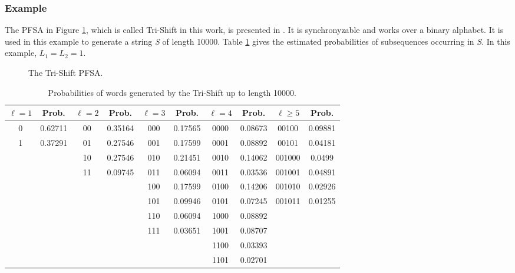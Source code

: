 {\subsubsection{Example}

The PFSA in Figure \ref{fig:trishift}, which is called Tri-Shift in this work, is presented in \citep{asok.11}. It is synchronyzable and works over a binary alphabet. It is used in this example to generate a string \textit{S} of length 10000. Table \ref{tab:trishiftsub} gives the estimated probabilities of subsequences occurring in \textit{S}. In this example, $L_1 = L_2 = 1$.

\begin{figure}
\centering
{}
\caption{The Tri-Shift PFSA.\label{fig:trishift}}
\end{figure}

\begin{table}
\centering
\caption{Probabilities of words generated by the Tri-Shift up to length 10000. \label{tab:trishiftsub}}
\begin{tabular}{|c|c|c|c|c|c|c|c|c|c|}
\hline
$\ell = 1$ & Prob. & $\ell = 2$ & Prob. & $\ell = 3$ & Prob. & $\ell = 4$ & Prob. & $\ell \geq 5$ & Prob.\\
\hline
0 & 0.62711 & 00 & 0.35164 & 000 & 0.17565 & 0000 & 0.08673 & 00100 & 0.09881\\
1 & 0.37291 & 01 & 0.27546 & 001 & 0.17599 & 0001 & 0.08892 & 00101 & 0.04181\\
  &      & 10 & 0.27546 & 010 & 0.21451 & 0010 & 0.14062 & 001000 & 0.0499\\
  &      & 11 & 0.09745 & 011 & 0.06094 & 0011 & 0.03536 & 001001 & 0.04891\\
  &	     &    &      & 100 & 0.17599 & 0100 & 0.14206 & 001010 & 0.02926\\
  &      &    &      & 101 & 0.09946 & 0101 & 0.07245 & 001011 & 0.01255\\
  &      &    &      & 110 & 0.06094 & 1000 & 0.08892 &        &     \\
  &      &    &      & 111 & 0.03651 & 1001 & 0.08707 &        &     \\
  &      &    &      &     &      & 1100 & 0.03393 &        &     \\
  &      &    &      &     &      & 1101 & 0.02701 &        &     \\
\hline
\end{tabular}
\end{table}

}

